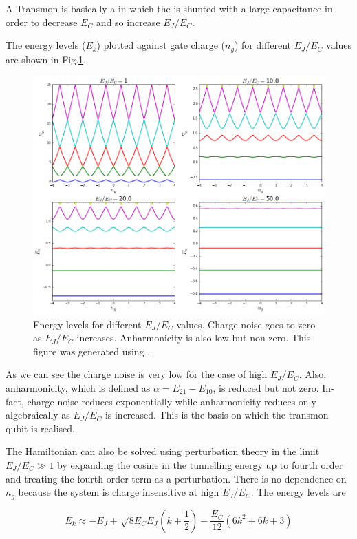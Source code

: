 A Transmon is basically a \CPB in which the \JJ is shunted with a large capacitance in order to decrease $E_C$ and so increase $E_J/E_C$.

The energy levels ($E_k$) plotted against gate charge ($n_g$) for different $E_J/E_C$ values are shown in Fig.\ref{fig:diff EJ/EC}.

\begin{figure}
\centering
\includegraphics[width=\linewidth]{Figures/EjEcall.png}
\decoRule
\caption[Different $E_J/E_C$]{Energy levels for different $E_J/E_C$ values. Charge noise goes to zero as $E_J/E_C$ increases. Anharmonicity is also low but non-zero. This figure was generated using \cite{Johansson2012}.}
\label{fig:diff EJ/EC}
\end{figure}

As we can see the charge noise is very low for the case of high $E_J/E_C$. Also, anharmonicity, which is defined as $\alpha=E_{21}-E_{10}$, is reduced but not zero. In-fact, charge noise reduces exponentially while anharmonicity reduces only algebraically as $E_J/E_C$ is increased. This is the basis on which the transmon qubit is realised.

The Hamiltonian can also be solved using perturbation theory in the limit $E_J/E_C\gg 1$ by expanding the cosine in the tunnelling energy up to fourth order and treating the fourth order term as a perturbation. There is no dependence on $n_g$ because the system is charge insensitive at high $E_J/E_C$. The energy levels are \cite{Koch2007a}

\begin{equation}
E_k\approx-E_J+\sqrt{8E_CE_J}\left(k+\frac{1}{2}\right)-\frac{E_C}{12}(6k^2+6k+3)
\label{eqn:transmon levels}
\end{equation}

